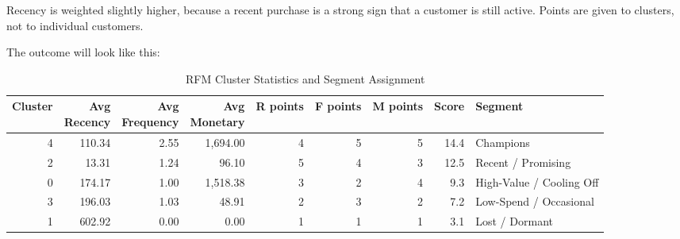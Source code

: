 Recency is weighted slightly higher, because a recent purchase is a strong sign that a customer is still active. Points
are given to clusters, not to individual customers.

The outcome will look like this:

\begin{table}[htbp]
  \centering
  \begingroup
  \scriptsize
  \setlength{\tabcolsep}{2pt}
  \begin{tabular}{rrrrrrrrl}
    \hline
    \textbf{Cluster} & \shortstack{\textbf{Avg}\\\textbf{Recency}} & \shortstack{\textbf{Avg}\\\textbf{Frequency}} & \shortstack{\textbf{Avg}\\\textbf{Monetary}} & \textbf{R points} & \textbf{F points} & \textbf{M points} & \textbf{Score} & \textbf{Segment}         \\
    \hline
    4                & 110.34                                      & 2.55                                          & 1,694.00                                     & 4                 & 5                 & 5                 & 14.4           & Champions                \\
    2                & 13.31                                       & 1.24                                          & 96.10                                        & 5                 & 4                 & 3                 & 12.5           & Recent / Promising       \\
    0                & 174.17                                      & 1.00                                          & 1,518.38                                     & 3                 & 2                 & 4                 & 9.3            & High-Value / Cooling Off \\
    3                & 196.03                                      & 1.03                                          & 48.91                                        & 2                 & 3                 & 2                 & 7.2            & Low-Spend / Occasional   \\
    1                & 602.92                                      & 0.00                                          & 0.00                                         & 1                 & 1                 & 1                 & 3.1            & Lost / Dormant           \\
    \hline
  \end{tabular}
  \caption{RFM Cluster Statistics and Segment Assignment}
  \label{tab:rfm_cluster_statistics}
  \endgroup
\end{table}

